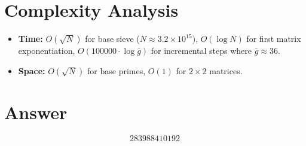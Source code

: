 \documentclass[12pt]{article}
\begin{document}
\section{Complexity Analysis}
\begin{itemize}
    \item \textbf{Time:} $O(\sqrt{N})$ for base sieve ($N \approx 3.2 \times 10^{15}$), $O(\log N)$ for first matrix exponentiation, $O(100000 \cdot \log \bar{g})$ for incremental steps where $\bar{g} \approx 36$.
    \item \textbf{Space:} $O(\sqrt{N})$ for base primes, $O(1)$ for $2\times 2$ matrices.
\end{itemize}

\section{Answer}

\[
\boxed{283988410192}
\]
\end{document}
